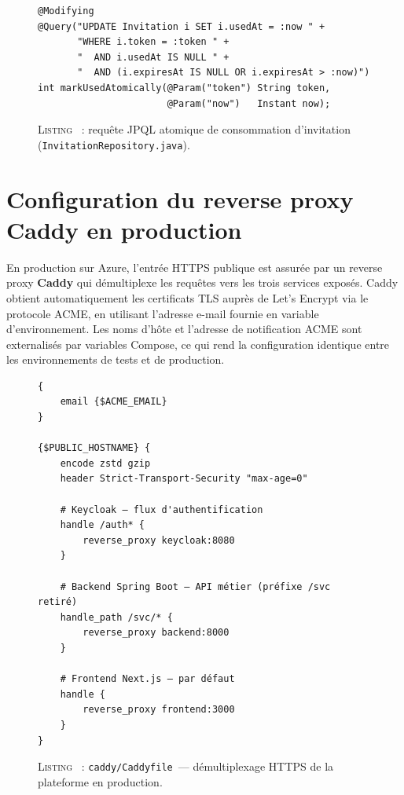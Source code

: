 \documentclass[12pt,a4paper]{report}
\begin{document}
\begin{figure}[H]
\centering
\begin{minipage}{0.95\textwidth}
\begin{verbatim}
@Modifying
@Query("UPDATE Invitation i SET i.usedAt = :now " +
       "WHERE i.token = :token " +
       "  AND i.usedAt IS NULL " +
       "  AND (i.expiresAt IS NULL OR i.expiresAt > :now)")
int markUsedAtomically(@Param("token") String token,
                       @Param("now")   Instant now);
\end{verbatim}
\end{minipage}
\label{lst:invitation-atomic}
\caption*{\textsc{Listing \thefigure}~: requête JPQL atomique de consommation d'invitation (\texttt{InvitationRepository.java}).}
\end{figure}

\section{Configuration du reverse proxy Caddy en production}
En production sur Azure, l'entrée HTTPS publique est assurée par un reverse proxy \textbf{Caddy} qui démultiplexe les requêtes vers les trois services exposés. Caddy obtient automatiquement les certificats TLS auprès de Let's Encrypt via le protocole ACME, en utilisant l'adresse e-mail fournie en variable d'environnement. Les noms d'hôte et l'adresse de notification ACME sont externalisés par variables Compose, ce qui rend la configuration identique entre les environnements de tests et de production.

\begin{figure}[H]
\centering
\begin{minipage}{0.85\textwidth}
\begin{verbatim}
{
    email {$ACME_EMAIL}
}

{$PUBLIC_HOSTNAME} {
    encode zstd gzip
    header Strict-Transport-Security "max-age=0"

    # Keycloak — flux d'authentification
    handle /auth* {
        reverse_proxy keycloak:8080
    }

    # Backend Spring Boot — API métier (préfixe /svc retiré)
    handle_path /svc/* {
        reverse_proxy backend:8000
    }

    # Frontend Next.js — par défaut
    handle {
        reverse_proxy frontend:3000
    }
}
\end{verbatim}
\end{minipage}
\label{lst:caddy}
\caption*{\textsc{Listing \thefigure}~: \texttt{caddy/Caddyfile}~--- démultiplexage HTTPS de la plateforme en production.}
\end{figure}
\end{document}
